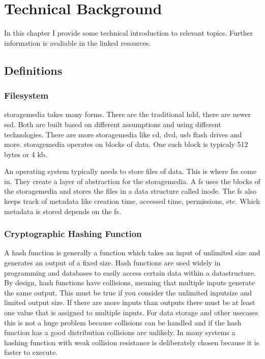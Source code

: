 
\chapter{Technical Background}

In this chapter I provide some technical introduction to relevant topics. Further information is avaliable in the linked resources.

\section{Definitions}

\subsection{Filesystem}
\label{sec:fs}

\gls{storagemedia} takes many forms. There are the traditional \gls{hdd}, there are newer \gls{ssd}. Both are built based on different assumptions and using different technologies. There are more \gls{storagemedia} like \gls{cd}, \gls{dvd}, \gls{usb} flash drives and more. \gls{storagemedia} operates on blocks of data. One such block is typicaly 512 bytes or 4 \gls{kb}. \cite{bruce:imaging}

An operating system typically needs to store files of data. This is where \glspl{fs} come in. They create a layer of abstraction for the \gls{storagemedia}. A \gls{fs} uses the blocks of the \gls{storagemedia} and stores the files in a data structure called inode. \cite{inode} The \gls{fs} also keeps track of \gls{metadata} like creation time, accessed time, permissions, etc. Which \gls{metadata} is stored depends on the \gls{fs}. \cite{bruce:imaging}

\subsection{Cryptographic Hashing Function}
\label{sec:hashing}

A hash function is generally a function which takes an input of unlimited size and generates an output of a fixed size. Hash functions are used widely in programming and databases to easily access certain data within a datastructure. By design, hash functions have collisions, meaning that multiple inputs generate the same output. This must be true if you consider the unlimited inputsize and limited output size. If there are more inputs than outputs there must be at least one value that is assigned to multiple inputs. For data storage and other usecases this is not a huge problem because collisions can be handled and if the hash function has a good distribution collisions are unlikely. In many systems a hashing function with weak collision resistance is deliberately chosen because it is faster to execute. \cite{hash:noncrypto, hash:slow}


